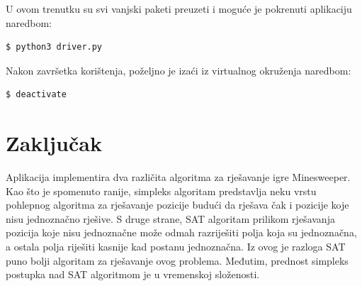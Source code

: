 \documentclass{article}
\numberwithin{figure}{section}
\numberwithin{table}{section}
\begin{document}
U ovom trenutku su svi vanjski paketi preuzeti i moguće je pokrenuti aplikaciju naredbom:
\begin{verbatim}
$ python3 driver.py
\end{verbatim}

Nakon završetka korištenja, poželjno je izaći iz virtualnog okruženja naredbom:
\begin{verbatim}
$ deactivate
\end{verbatim}


\section{Zaključak}

Aplikacija implementira dva različita algoritma za rješavanje igre Minesweeper.
Kao što je spomenuto ranije, simpleks algoritam predstavlja neku vrstu pohlepnog algoritma
za rješavanje pozicije budući da rješava čak i pozicije koje nisu jednoznačno rješive.
S druge strane, SAT algoritam prilikom rješavanja pozicija koje nisu jednoznačne može
odmah razriješiti polja koja su jednoznačna, a ostala polja riješiti kasnije kad
postanu jednoznačna. Iz ovog je razloga SAT puno bolji algoritam za rješavanje ovog
problema. Međutim, prednost simpleks postupka nad SAT algoritmom je u vremenskoj složenosti.

\printbibliography
\end{document}
